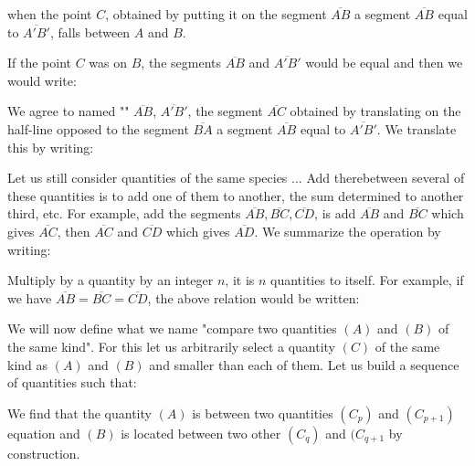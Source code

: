 	when the point $C$, obtained by putting it on the segment $\overline{AB}$ a segment  $\overline{AB}$ equal to $\overline{A'B'}$, falls between $A$ and $B$.
	
	If the point $C$ was on $B$, the segments $\overline{AB}$ and $\overline{A'B'}$  would be equal and then we would write:
	
	We agree to named "" $\overline{AB}$, $\overline{A'B'}$, the segment $\overline{AC}$ obtained by translating on the half-line opposed to the segment $\overline{BA}$ a segment $\overline{AB}$ equal to $\overline{A'B'}$. We translate this by writing:
	
	Let us still consider quantities of the same species ... Add therebetween several of these quantities is to add one of them to another, the sum determined to another third, etc. For example, add the segments $\overline{AB}, \overline{BC}, \overline{CD}$, is add $\overline{AB}$ and $\overline{BC}$ which gives $\overline{AC}$, then $\overline{AC}$ and $\overline{CD}$ which gives $\overline{AD}$. We summarize the operation by writing:
	
	Multiply by a quantity by an integer $n$, it is $n$ quantities to itself. For example, if we have $\overline{AB} = \overline{BC} =\overline{CD}$, the above relation would be written:
	
	We will now define what we name "compare two quantities $(A)$ and $(B)$ of the same kind". For this let us arbitrarily select a quantity $(C)$ of the same kind as $(A)$ and $(B)$ and smaller than each of them. Let us build a sequence of quantities such that:
	
	We find that the quantity $(A)$ is between two quantities $(C_p)$ and $(C_{p+1})$ equation and $(B)$ is located between two other $(C_q)$ and $(C_{q+1}$ by construction.
	
